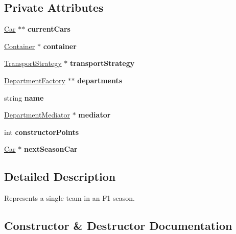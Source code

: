 \subsection*{Private Attributes}
\begin{DoxyCompactItemize}
\item 
\mbox{\label{classTeam_a3ac0bc2f7b4448ad19877b500ad2109b}} 
\hyperlink{classCar}{Car} $\ast$$\ast$ {\bfseries current\+Cars}
\item 
\mbox{\label{classTeam_a280846f18ee644e8f07c9512cf104ba4}} 
\hyperlink{classContainer}{Container} $\ast$ {\bfseries container}
\item 
\mbox{\label{classTeam_aeae51e4ff579869875a133b06ac34b17}} 
\hyperlink{classTransportStrategy}{Transport\+Strategy} $\ast$ {\bfseries transport\+Strategy}
\item 
\mbox{\label{classTeam_a212a9dc5c5a848243a58dc8f2a0176e3}} 
\hyperlink{classDepartmentFactory}{Department\+Factory} $\ast$$\ast$ {\bfseries departments}
\item 
\mbox{\label{classTeam_abca0ac315f8fb0cb636769b7861f0499}} 
string {\bfseries name}
\item 
\mbox{\label{classTeam_a0a53b08f463f9e4efcfebbad77c6395b}} 
\hyperlink{classDepartmentMediator}{Department\+Mediator} $\ast$ {\bfseries mediator}
\item 
\mbox{\label{classTeam_a340b64e10e2798908300461f235b9cd1}} 
int {\bfseries constructor\+Points}
\item 
\mbox{\label{classTeam_a8ffeb82cd0eab84dbc97982e5b1c3085}} 
\hyperlink{classCar}{Car} $\ast$ {\bfseries next\+Season\+Car}
\end{DoxyCompactItemize}


\subsection{Detailed Description}
Represents a single team in an F1 season. 

\subsection{Constructor \& Destructor Documentation}
\mbox{\label{classTeam_acb3e8e4707763829d17d70b26deaee34}} 
